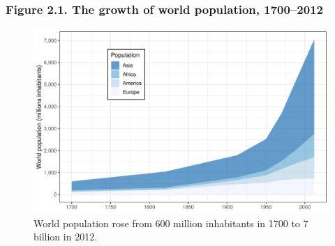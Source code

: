 \documentclass[t]{beamer}\usepackage[]{graphicx}\usepackage[]{color}
\newenvironment{knitrout}{}{} %
\begin{document}
\begin{frame}[label=Figure_2_1b]
\frametitle{Figure 2.1. The growth of world population, 1700--2012}
\begin{figure}[t]
\begin{minipage}[b]{\textwidth}
\centering
\begin{knitrout}\footnotesize
{}\color{fgcolor}

{\centering \includegraphics[width=1\linewidth]{figures/color/Figure_2_1b} 

}



\end{knitrout}
\caption{World population rose from 600 million inhabitants in 1700 to 7 billion in 2012.}
\end{minipage}
\end{figure}
\end{frame}
\end{document}
